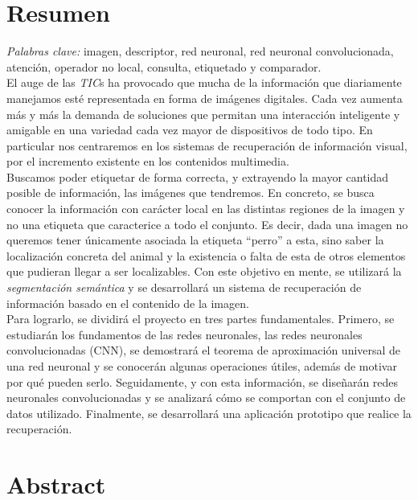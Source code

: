 %
\chapter{Resumen}
\emph{Palabras clave:} imagen, descriptor, red neuronal, red neuronal convolucionada, atención, operador no local, consulta, etiquetado y comparador.\\

El auge de las \emph{TIC}s ha provocado que mucha de la información que diariamente manejamos esté representada en forma de imágenes digitales. Cada vez aumenta más y más la demanda de soluciones que permitan una interacción inteligente y amigable en una variedad cada vez mayor de dispositivos de todo tipo. En particular nos centraremos en los sistemas de recuperación de información visual, por el incremento existente en los contenidos multimedia.\\

Buscamos poder etiquetar de forma correcta, y extrayendo la mayor cantidad posible de información, las imágenes que tendremos. En concreto, se busca conocer la información con carácter local en las distintas regiones de la imagen y no una etiqueta que caracterice a todo el conjunto. Es decir, dada una imagen no queremos tener únicamente asociada la etiqueta ``perro'' a esta, sino saber la localización concreta del animal y la existencia o falta de esta de otros elementos que pudieran llegar a ser localizables. Con este objetivo en mente, se utilizará la \emph{segmentación semántica} y se desarrollará un sistema de recuperación de información basado en el contenido de la imagen.\\

Para lograrlo, se dividirá el proyecto en tres partes fundamentales. Primero, se estudiarán los fundamentos de las redes neuronales, las redes neuronales convolucionadas (CNN), se demostrará el teorema de aproximación universal de una red neuronal y se conocerán algunas operaciones útiles, además de motivar por qué pueden serlo. Seguidamente, y con esta información, se diseñarán redes neuronales convolucionadas y se analizará cómo se comportan con el conjunto de datos utilizado. Finalmente, se desarrollará una aplicación prototipo que realice la recuperación.

\chapter{Abstract}

